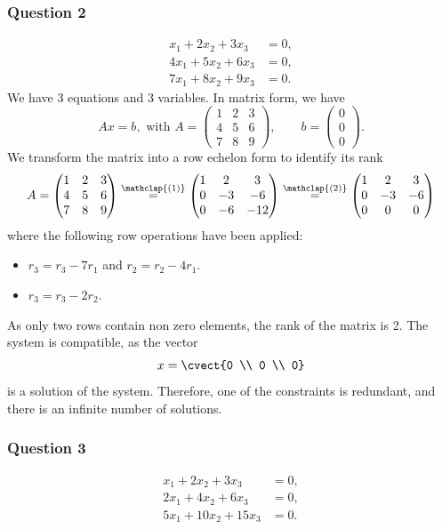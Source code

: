 \subsubsection*{Question 2}
\begin{align*}
x_1+2x_2+3x_3 & = 0,\\
4x_1+5x_2+6x_3 & = 0,\\
7x_1+8x_2+9x_3 & =0.
\end{align*}
We have 3 equations and 3 variables. In matrix form, we have
\[
Ax = b, \text{ with } A= \begin{pmatrix}
1&2&3\\ 4&5&6\\ 7&8&9
\end{pmatrix}, \qquad b = \begin{pmatrix}
0\\0\\0
\end{pmatrix}.
\]
We transform the matrix into a row echelon form to identify its rank
\[
A=
\begin{pmatrix}
  1 & 2 & 3 \\ 4 & 5 & 6 \\ 7 & 8 & 9 
\end{pmatrix}
\stackrel{\mathclap{(1)}}{=}
\begin{pmatrix}
  1 & 2 & 3 \\ 0 & -3 & -6 \\ 0 & -6 & -12 
\end{pmatrix}
\stackrel{\mathclap{(2)}}{=}
\begin{pmatrix}
  1 & 2 & 3 \\ 0 & -3 & -6 \\ 0 & 0 & 0 
\end{pmatrix}
\]
where the following row operations have been applied:
\begin{itemize}
\item[(1)] $r_3 = r_3 - 7r_1$ and $r_2=r_2-4r_1$.
\item[(2)] $r_3 = r_3-2 r_2$.
\end{itemize}
As only two rows contain non zero elements, the rank of the matrix is 2. 
The system is compatible, as the vector
\[
x=\cvect{0 \\ 0 \\ 0}
\]
is a solution of the system. Therefore, one of the constraints is
redundant, and there is an infinite number of solutions.

\subsubsection*{Question 3}
\begin{align*}
x_1+2x_2+3x_3 & = 0,\\
2x_1+4x_2+6x_3 & =0,\\
5x_1+10x_2+15x_3 & =0.
\end{align*}

